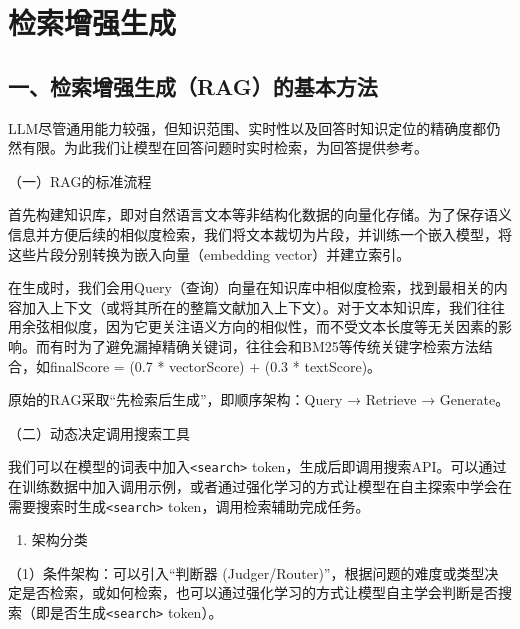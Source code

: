 \setcounter{section}{0}

\hypertarget{ux68c0ux7d22ux589eux5f3aux751fux6210}{%
\section{检索增强生成}\label{ux68c0ux7d22ux589eux5f3aux751fux6210}}

\hypertarget{ux4e00ux68c0ux7d22ux589eux5f3aux751fux6210ragux7684ux57faux672cux65b9ux6cd5}{%
\subsection{一、检索增强生成（RAG）的基本方法}\label{ux4e00ux68c0ux7d22ux589eux5f3aux751fux6210ragux7684ux57faux672cux65b9ux6cd5}}

LLM尽管通用能力较强，但知识范围、实时性以及回答时知识定位的精确度都仍然有限。为此我们让模型在回答问题时实时检索，为回答提供参考。

（一）RAG的标准流程

首先构建知识库，即对自然语言文本等非结构化数据的向量化存储。为了保存语义信息并方便后续的相似度检索，我们将文本裁切为片段，并训练一个嵌入模型，将这些片段分别转换为嵌入向量（embedding vector）并建立索引。

在生成时，我们会用Query（查询）向量在知识库中相似度检索，找到最相关的内容加入上下文（或将其所在的整篇文献加入上下文）。对于文本知识库，我们往往用余弦相似度，因为它更关注语义方向的相似性，而不受文本长度等无关因素的影响。而有时为了避免漏掉精确关键词，往往会和BM25等传统关键字检索方法结合，如finalScore = (0.7 * vectorScore) + (0.3 * textScore)。

原始的RAG采取``先检索后生成''，即顺序架构：Query → Retrieve → Generate。

（二）动态决定调用搜索工具

我们可以在模型的词表中加入\texttt{\textless{}search\textgreater{}} token，生成后即调用搜索API。可以通过在训练数据中加入调用示例，或者通过强化学习的方式让模型在自主探索中学会在需要搜索时生成\texttt{\textless{}search\textgreater{}} token，调用检索辅助完成任务。

\begin{enumerate}
\def\labelenumi{\arabic{enumi}.}
\tightlist
\item
  架构分类
\end{enumerate}

（1）条件架构：可以引入``判断器 (Judger/Router)''，根据问题的难度或类型决定是否检索，或如何检索，也可以通过强化学习的方式让模型自主学会判断是否搜索（即是否生成\texttt{\textless{}search\textgreater{}} token）。

